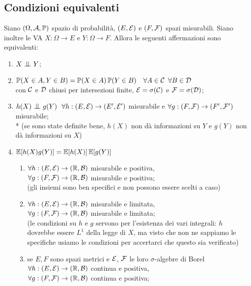 \subsection{Condizioni equivalenti}
\begin{teob}[\JPTh{10.1}]
  Siano $(\Omega, \mathcal A, \mathbb P)$ spazio di probabilità, $(E, \mathcal E)$ e $(F, \mathcal F) $ spazi misurabili. Siano inoltre le VA $X:\Omega \to E $ e $ Y:\Omega \to F $. Allora le seguenti affermazioni sono equivalenti:
  \begin{enumerate}
    \item $X \indep Y$;
    \item $ \mathbb P(X \in A, Y \in B)=\mathbb P(X \in A) \, \mathbb P(Y \in B) \quad \forall A \in \mathcal C\enspace \forall B \in \mathcal D$ \\
    con $\mathcal C$ e $\mathcal D$ chiusi per intersezioni finite, $\mathcal E = \sigma(\mathcal C)$ e $\mathcal F = \sigma(\mathcal D)$;
    \item $ h(X) \indep g(Y) \ \ \forall h: (E, \Ec) \to (E', \Ec')$ misurabile e $\forall g: (F, \mathcal F) \to (F', \mathcal F')$ misurabile; \\*
    (se sono state definite bene, $h(X)$ non dà informazioni su $Y$ e $g(Y)$ non dà informazioni su $X$)
    \item $ \mathbb E[h(X)g(Y)]=\mathbb E[h(X)] \, \mathbb E[g(Y)]$
    \begin{enumerate}
    \item $\forall h: (E, \mathcal E) \to (\mathbb R,\mathcal B)$ misurabile e positiva, \\
        $\forall g: (F, \mathcal F) \to (\mathbb R,\mathcal B)$ misurabile e positiva; \\
        (gli insiemi sono ben specifici e non possono essere scelti a caso)
    \item $\forall h: (E, \mathcal E) \to (\mathbb R,\mathcal B)$ misurabile e limitata, \\
        $\forall g: (F, \mathcal F) \to (\mathbb R,\mathcal B)$ misurabile e limitata; \\
        (le condizioni su $h$ e $g$ servono per l'esistenza dei vari integrali: $h$ dovrebbe essere $L^1$ della legge di $X$, ma visto che non ne sappiamo le specifiche usiamo le condizioni per accertarci che questo sia verificato)
    \item
      se $E, F$ sono spazi metrici e $ \mathcal E$, $\mathcal F$ le loro $\sigma$-algebre di Borel \\
      $\forall h: (E, \mathcal E) \to (\mathbb R,\mathcal B)$ continua e positiva, \\
      $\forall g: (F, \mathcal F) \to (\mathbb R,\mathcal B)$ continua e positiva; \\

    \end{enumerate}
  \end{enumerate}
\end{teob}

